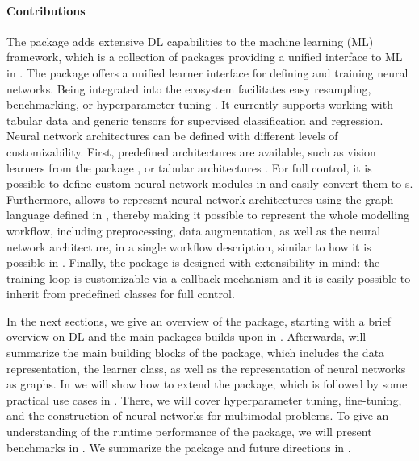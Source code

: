 \documentclass[article]{jss}
\theoremstyle{definition}
\begin{document}
\paragraph{Contributions} The  package adds extensive DL capabilities to the \mlrt{} machine learning (ML) framework, which is a collection of \rlang{} packages providing a unified interface to ML in \rlang{}.
The package offers a unified learner interface for defining and training neural networks.
Being integrated into the \mlrt{} ecosystem facilitates easy resampling, benchmarking, or hyperparameter tuning \citep{ref-mlr3tuning2024}.
It currently supports working with tabular data and generic tensors for supervised classification and regression.
Neural network architectures can be defined with different levels of customizability.
First, predefined architectures are available, such as vision learners from the  \rlang{} package \citep{ref-r-torchvision}, or tabular architectures \citep{gorishniy2021revisiting}.
For full control, it is possible to define custom neural network modules in  \torch{} and easily convert them to \mlrt{} s.
Furthermore, \mlrttorch{} allows to represent neural network architectures using the graph language defined in \mlrtpipelines{}, thereby making it possible to represent the whole modelling workflow, including preprocessing, data augmentation, as well as the neural network architecture, in a single workflow description, similar to how it is possible in \keras{} \citep{ref-chollet2018keras}.
Finally, the package is designed with extensibility in mind: the training loop is customizable via a callback mechanism and it is easily possible to inherit from predefined classes for full control.

In the next sections, we give an overview of the package, starting with a brief overview on DL and the main \rlang{} packages \mlrttorch{} builds upon in .
Afterwards,  will summarize the main building blocks of the package, which includes the data representation, the learner class, as well as the representation of neural networks as graphs.
In  we will show how to extend the package, which is followed by some practical use cases in .
There, we will cover hyperparameter tuning, fine-tuning, and the construction of neural networks for multimodal problems.
To give an understanding of the runtime performance of the package, we will present benchmarks in .
We summarize the package and future directions in .
\end{document}
